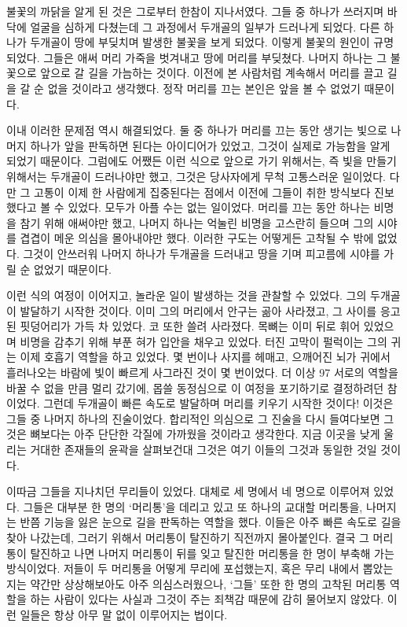 \begin{article}
불꽃의 까닭을 알게 된 것은 그로부터 한참이 지나서였다. 그들 중 하나가 쓰러지며 바닥에 얼굴을 심하게 다쳤는데 그 과정에서 두개골의 일부가 드러나게 되었다. 다른 하나가 두개골이 땅에 부딪치며 발생한 불꽃을 보게 되었다. 이렇게 불꽃의 원인이 규명되었다. 그들은 애써 머리 가죽을 벗겨내고 땅에 머리를 부딪쳤다. 나머지 하나는 그 불꽃으로 앞으로 갈 길을 가늠하는 것이다. 이전에 본 사람처럼 계속해서 머리를 끌고 길을 갈 순 없을 것이라고 생각했다. 정작 머리를 끄는 본인은 앞을 볼 수 없었기 때문이다.

이내 이러한 문제점 역시 해결되었다. 둘 중 하나가 머리를 끄는 동안 생기는 빛으로 나머지 하나가 앞을 판독하면 된다는 아이디어가 있었고, 그것이 실제로 가능함을 알게 되었기 때문이다. 그럼에도 어쨌든 이런 식으로 앞으로 가기 위해서는, 즉 빛을 만들기 위해서는 두개골이 드러나야만 했고, 그것은 당사자에게 무척 고통스러운 일이었다. 다만 그 고통이 이제 한 사람에게 집중된다는 점에서 이전에 그들이 취한 방식보다 진보했다고 볼 수 있었다. 모두가 아플 수는 없는 일이었다. 머리를 끄는 동안 하나는 비명을 참기 위해 애써야만 했고, 나머지 하나는 억눌린 비명을 고스란히 들으며 그의 시야를 겹겹이 메운 의심을 몰아내야만 했다. 이러한 구도는 어떻게든 고착될 수 밖에 없었다. 그것이 안쓰러워 나머지 하나가 두개골을 드러내고 땅을 기며 피고름에 시야를 가릴 순 없었기 때문이다.

이런 식의 여정이 이어지고, 놀라운 일이 발생하는 것을 관찰할 수 있었다. 그의 두개골이 발달하기 시작한 것이다. 이미 그의 머리에서 안구는 곪아 사라졌고, 그 사이를 응고된 핏덩어리가 가득 차 있었다. 코 또한 쓸려 사라졌다. 목뼈는 이미 뒤로 휘어 있었으며 비명을 감추기 위해 부푼 혀가 입안을 채우고 있었다. 터진 고막이 펄럭이는 그의 귀는 이제 호흡기 역할을 하고 있었다. 몇 번이나 사지를 헤매고, 으깨어진 뇌가 귀에서 흘러나오는 바람에 빛이 빠르게 사그라진 것이 몇 번이었다. 더 이상 97 서로의 역할을 바꿀 수 없을 만큼 멀리 갔기에, 몹쓸 동정심으로 이 여정을 포기하기로 결정하려던 참이었다. 그런데 두개골이 빠른 속도로 발달하며 머리를 키우기 시작한 것이다! 이것은 그들 중 나머지 하나의 진술이었다. 합리적인 의심으로 그 진술을 다시 들여다보면 그것은 뼈보다는 아주 단단한 각질에 가까웠을 것이라고 생각한다. 지금 이곳을 낮게 울리는 거대한 존재들의 윤곽을 살펴보건대 그것은 여기 이들의 그것과 동일한 것일 것이다.

이따금 그들을 지나치던 무리들이 있었다. 대체로 세 명에서 네 명으로 이루어져 있었다. 그들은 대부분 한 명의 `머리통'을 데리고 있고 또 하나의 교대할 머리통을, 나머지는 반쯤 기능을 잃은 눈으로 길을 판독하는 역할을 했다. 이들은 아주 빠른 속도로 길을 찾아 나갔는데, 그러기 위해서 머리통이 탈진하기 직전까지 몰아붙인다. 결국 그 머리통이 탈진하고 나면 나머지 머리통이 뒤를 잊고 탈진한 머리통을 한 명이 부축해 가는 방식이었다. 저들이 두 머리통을 어떻게 무리에 포섭했는지, 혹은 무리 내에서 뽑았는지는 약간만 상상해보아도 아주 의심스러웠으나, `그들' 또한 한 명의 고착된 머리통 역할을 하는 사람이 있다는 사실과 그것이 주는 죄책감 때문에 감히 물어보지 않았다. 이런 일들은 항상 아무 말 없이 이루어지는 법이다.


\end{article}
